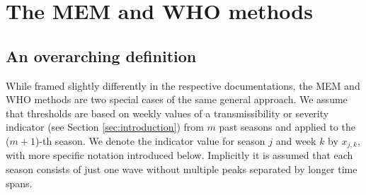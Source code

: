 \documentclass[12pt]{article}
\begin{document}
\section{The MEM and WHO methods}
\label{sec:mem_and_who}

\subsection{An overarching definition}
\label{subsec:definitions}

While framed slightly differently in the respective documentations, the MEM and WHO methods are two special cases of the same general approach. We assume that thresholds are based on weekly values of a transmissibility or severity indicator (see Section \ref{sec:introduction}) from $m$ past seasons and applied to the ($m + 1$)-th season.  We denote the indicator value for season $j$ and week $k$ by $x_{j, k}$, with more specific notation introduced below. Implicitly it is assumed that each season consists of just one wave without multiple peaks separated by longer time spans.
\end{document}
